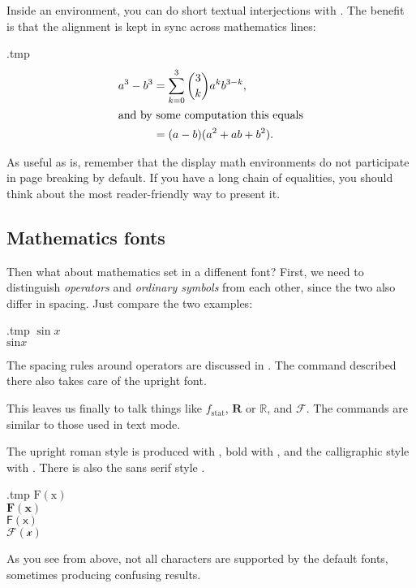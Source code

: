 Inside an  environment, you can do short textual interjections with .
The benefit is that the alignment is kept in sync across mathematics lines:
%
\begin{VerbatimOut}{\jobname.tmp}
\begin{align}
a^3 - b^3
&= \sum_{k=0}^3 \binom 3 k a^k b^{3-k},\\
\intertext{and by some computation this equals}
&= (a-b)(a^2 + ab + b^2).
\end{align}
\end{VerbatimOut}
\ShowExampleBelow

\begin{practices}
As useful as  is,
remember that the display math environments do not participate in page breaking by default.
If you have a long chain of equalities,
you should think about the most reader-friendly way to present it.
\end{practices}


%
%
\subsection{Mathematics fonts}

Then what about mathematics set in a diffenent font?
First, we need to distinguish \emph{operators} and \emph{ordinary symbols} from each other,
since the two also differ in spacing.
Just compare the two examples:
%
\begin{VerbatimOut}{\jobname.tmp}
$\sin x$\\
$\mathrm{sin} x$
\end{VerbatimOut}
\ShowExample
%
The spacing rules around operators are discussed in .
The  command described there also takes care of the upright font.

This leaves us finally to talk things like $f_{\mathrm{stat}}$,
$\mathbf R$ or $\mathbb R$, and $\mathcal F$.
The commands are similar to those used in text mode.

The upright roman style is produced with ,
bold with ,
and the calligraphic style with .
There is also the sans serif style .
%
\begin{VerbatimOut}{\jobname.tmp}
$\mathrm{F(x)}$\\
$\mathbf{F(x)}$\\
$\mathsf{F(x)}$\\
$\mathcal{F(x)}$
\end{VerbatimOut}
\ShowExample
%
As you see from above, not all characters are supported by the default fonts,
sometimes producing confusing results.

